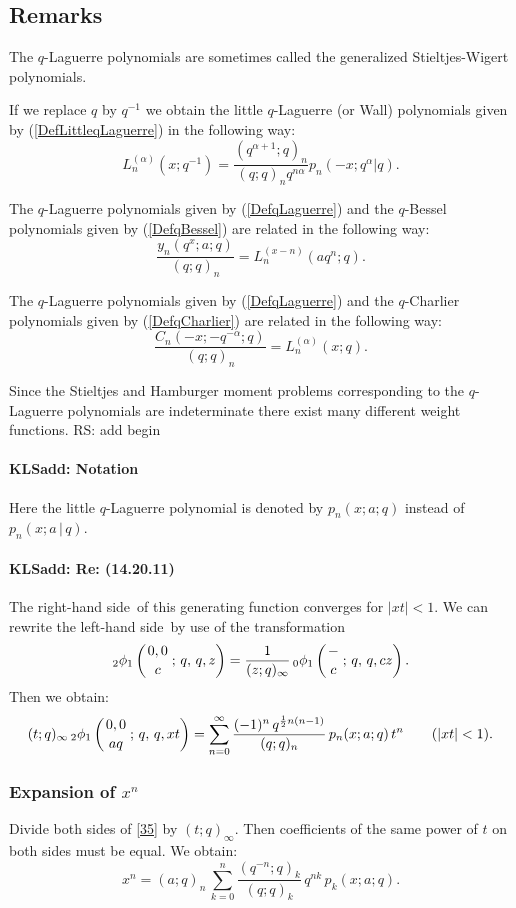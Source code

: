 \documentclass[envcountchap,graybox]{svmono}
\newcommand{\qhyp}[5]{\mbox{}_{#1}{\phi}_{#2}
\left(\genfrac{}{}{0pt}{}{#3}{#4}\,;\,q,\,#5\right)}
\newcommand\half{\frac12}
\newcommand\iy\infty
\newcommand{\qhyp}[5]{\,\mbox{}_{#1}\phi_{#2}\!\left(
  \genfrac{}{}{0pt}{}{#3}{#4};#5\right)}
\newcommand\LHS{left-hand side}
\newcommand\RHS{right-hand side}
\begin{document}
{{\subsection*{Remarks} 
The $q$-Laguerre polynomials are sometimes called the
generalized Stieltjes-Wigert polynomials.

If we replace $q$ by $q^{-1}$ we obtain the little $q$-Laguerre
(or Wall) polynomials given by (\ref{DefLittleqLaguerre}) in the following
way:
$$L_n^{(\alpha)}(x;q^{-1})=\frac{(q^{\alpha+1};q)_n}{(q;q)_nq^{n\alpha}}p_n(-x;q^{\alpha}|q).$$

\noindent
The $q$-Laguerre polynomials given by (\ref{DefqLaguerre}) and the $q$-Bessel polynomials
given by (\ref{DefqBessel}) are related in the following way:
$$\frac{y_n(q^x;a;q)}{(q;q)_n}=L_n^{(x-n)}(aq^n;q).$$

\noindent
The $q$-Laguerre polynomials given by (\ref{DefqLaguerre}) and the
$q$-Charlier polynomials given by (\ref{DefqCharlier}) are related in the
following way:
$$\frac{C_n(-x;-q^{-\alpha};q)}{(q;q)_n}=L_n^{(\alpha)}(x;q).$$

\noindent
Since the Stieltjes and Hamburger moment problems corresponding to the
$q$-Laguerre polynomials are indeterminate there exist many different weight
functions.
 RS: add begin\label{sec14.20}
%
\paragraph{\large\bf KLSadd: Notation}Here the little $q$-Laguerre polynomial is denoted by
$p_n(x;a;q)$ instead of
$p_n(x;a\,|\, q)$.
%
\paragraph{\large\bf KLSadd: Re: (14.20.11)}The \RHS\ of this generating function converges for $|xt|<1$.
We can rewrite the \LHS\ by use of the transformation
\begin{equation*}
\qhyp21{0,0}c{q,z}=\frac1{(z;q)_\iy}\,\qhyp01-c{q,cz}.
\end{equation*}
Then we obtain:
\begin{equation}
(t;q)_\iy\,\qhyp21{0,0}{aq}{q,xt}
=\sum_{n=0}^\iy\frac{(-1)^n\,q^{\half n(n-1)}}{(q;q)_n}\,
p_n(x;a;q)\,t^n\qquad(|xt|<1).
\label{35}
\end{equation}
%
\subsubsection*{Expansion of $x^n$}
Divide both sides of \eqref{35} by $(t;q)_\iy$. Then coefficients of the
same power of $t$ on both sides must be equal. We obtain:
\begin{equation}
x^n=(a;q)_n\,\sum_{k=0}^n \frac{(q^{-n};q)_k}{(q;q)_k}\,q^{nk}\,p_k(x;a;q).
\label{36}
\end{equation}
%
}}
\end{document}
